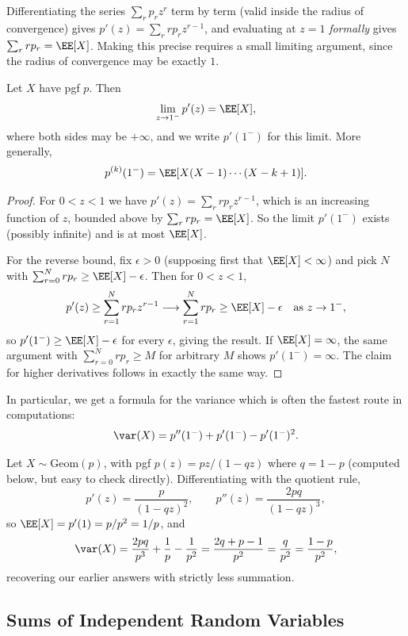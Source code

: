 Differentiating the series $\sum_r p_r z^r$ term by term (valid inside the radius of convergence) gives $p'(z) = \sum_r r p_r z^{r - 1}$, and evaluating at $z = 1$ \emph{formally} gives $\sum_r r p_r = \EE[X]$. Making this precise requires a small limiting argument, since the radius of convergence may be exactly $1$.

\begin{theorem}
	Let $X$ have pgf $p$. Then
	$$
	\lim_{z \to 1^-} p'(z) = \EE[X],
	$$
	where both sides may be $+\infty$, and we write $p'(1^-)$ for this limit. More generally,
	$$
	p^{(k)}(1^-) = \EE[X(X - 1)\cdots(X - k + 1)].
	$$
\end{theorem}
\begin{proof}
	For $0 < z < 1$ we have $p'(z) = \sum_{r} r p_r z^{r - 1}$, which is an increasing function of $z$, bounded above by $\sum_r r p_r = \EE[X]$. So the limit $p'(1^-)$ exists (possibly infinite) and is at most $\EE[X]$.

	For the reverse bound, fix $\epsilon > 0$ (supposing first that $\EE[X] < \infty$) and pick $N$ with $\sum_{r = 0}^{N} r p_r \geq \EE[X] - \epsilon$. Then for $0 < z < 1$,
	$$
	p'(z) \geq \sum_{r = 1}^{N} r p_r z^{r - 1} \longrightarrow \sum_{r = 1}^{N} r p_r \geq \EE[X] - \epsilon \quad \text{as } z \rightarrow 1^-,
	$$
	so $p'(1^-) \geq \EE[X] - \epsilon$ for every $\epsilon$, giving the result. If $\EE[X] = \infty$, the same argument with $\sum_{r=0}^N rp_r \geq M$ for arbitrary $M$ shows $p'(1^-) = \infty$. The claim for higher derivatives follows in exactly the same way.
\end{proof}

In particular, we get a formula for the variance which is often the fastest route in computations:
$$
\var(X) = p''(1^-) + p'(1^-) - p'(1^-)^2.
$$

\begin{example}
	Let $X \sim \mathrm{Geom}(p)$, with pgf $p(z) = pz/(1 - qz)$ where $q = 1 - p$ (computed below, but easy to check directly). Differentiating with the quotient rule,
	$$
	p'(z) = \frac{p}{(1 - qz)^2}, \qquad p''(z) = \frac{2pq}{(1 - qz)^3},
	$$
	so $\EE[X] = p'(1) = p/p^2 = 1/p$, and
	$$
	\var(X) = \frac{2pq}{p^3} + \frac{1}{p} - \frac{1}{p^2} = \frac{2q + p - 1}{p^2} = \frac{q}{p^2} = \frac{1-p}{p^2},
	$$
	recovering our earlier answers with strictly less summation.
\end{example}

\subsection{Sums of Independent Random Variables}

